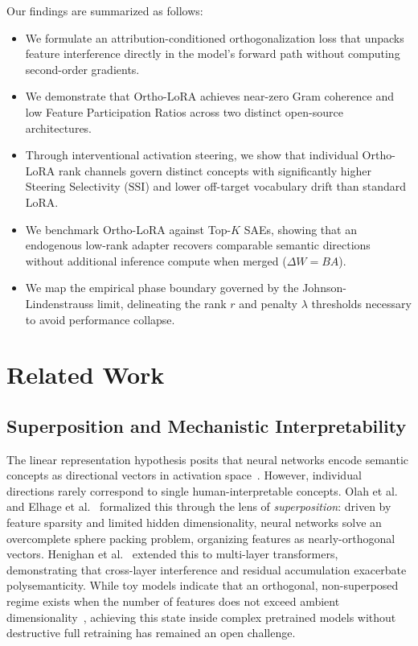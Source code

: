 \documentclass[10pt,twocolumn,letterpaper]{article}
\begin{document}
\noindent Our findings are summarized as follows:
\begin{itemize}
    \item We formulate an attribution-conditioned orthogonalization loss that unpacks feature interference directly in the model's forward path without computing second-order gradients.
    \item We demonstrate that Ortho-LoRA achieves near-zero Gram coherence and low Feature Participation Ratios across two distinct open-source architectures.
    \item Through interventional activation steering, we show that individual Ortho-LoRA rank channels govern distinct concepts with significantly higher Steering Selectivity ($\text{SSI}$) and lower off-target vocabulary drift than standard LoRA.
    \item We benchmark Ortho-LoRA against Top-$K$ SAEs, showing that an endogenous low-rank adapter recovers comparable semantic directions without additional inference compute when merged ($\Delta W = BA$).
    \item We map the empirical phase boundary governed by the Johnson-Lindenstrauss limit, delineating the rank $r$ and penalty $\lambda$ thresholds necessary to avoid performance collapse.
\end{itemize}

\section{Related Work}
\label{sec:related_work}

\subsection{Superposition and Mechanistic Interpretability}
The linear representation hypothesis posits that neural networks encode semantic concepts as directional vectors in activation space~\cite{mikolov2013distributed,park2023linear}. However, individual directions rarely correspond to single human-interpretable concepts. Olah et al.~\cite{olah2020zoom} and Elhage et al.~\cite{elhage2022toy} formalized this through the lens of \textit{superposition}: driven by feature sparsity and limited hidden dimensionality, neural networks solve an overcomplete sphere packing problem, organizing features as nearly-orthogonal vectors. Henighan et al.~\cite{henighan2023superposition} extended this to multi-layer transformers, demonstrating that cross-layer interference and residual accumulation exacerbate polysemanticity. While toy models indicate that an orthogonal, non-superposed regime exists when the number of features does not exceed ambient dimensionality~\cite{elhage2022toy}, achieving this state inside complex pretrained models without destructive full retraining has remained an open challenge.
\end{document}
